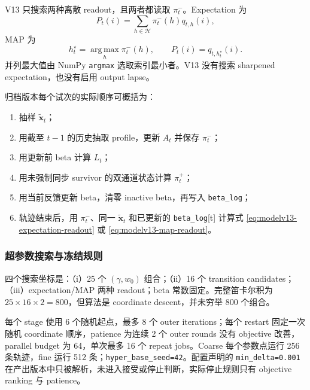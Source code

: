 V13 只搜索两种离散 readout，且两者都读取 $\pi_t^-$。Expectation 为
\begin{equation}
    P_t(i)=\sum_{h\in\mathcal H}\pi_t^-(h)q_{t,h}(i),
    \label{eq:modelv13-expectation-readout}
\end{equation}
MAP 为
\begin{equation}
    h_t^\star=\operatorname*{arg\,max}_{h}\pi_t^-(h),
    \qquad P_t(i)=q_{t,h_t^\star}(i).
    \label{eq:modelv13-map-readout}
\end{equation}
并列最大值由 NumPy \texttt{argmax} 选取索引最小者。V13 没有搜索 sharpened expectation，也没有启用 output lapse。

归档版本每个试次的实际顺序可概括为：
\begin{enumerate}
    \item 抽样 $\widetilde{\mathbf x}_t$；
    \item 用截至 $t-1$ 的历史抽取 profile，更新 $A_t$ 并保存 $\pi_t^-$；
    \item 用更新前 beta 计算 $L_t$；
    \item 用未强制同步 survivor 的双通道状态计算 $\pi_t^+$；
    \item 用当前反馈更新 beta，清零 inactive beta，再写入 \texttt{beta\_log}；
    \item 轨迹结束后，用 $\pi_t^-$、同一 $\widetilde{\mathbf x}_t$ 和已更新的 \texttt{beta\_log}[t] 计算式 \ref{eq:modelv13-expectation-readout} 或 \ref{eq:modelv13-map-readout}。
\end{enumerate}


\subsubsection{超参数搜索与冻结规则}

四个搜索坐标是：（i）25 个 $(\gamma,w_0)$ 组合；（ii）16 个 transition candidates；（iii）expectation/MAP 两种 readout；beta 常数固定。完整笛卡尔积为 $25\times16\times2=800$，但算法是 coordinate descent，并未穷举 800 个组合。

每个 stage 使用 6 个随机起点，最多 8 个 outer iterations；每个 restart 固定一次随机 coordinate 顺序，patience 为连续 2 个 outer rounds 没有 objective 改善，parallel budget 为 64，单次最多 16 个 repeat jobs。Coarse 每个参数点运行 256 条轨迹，fine 运行 512 条；\texttt{hyper\_base\_seed=42}。配置声明的 \texttt{min\_delta=0.001} 在产出版本中只被解析，未进入接受或停止判断，实际停止规则只有 objective ranking 与 patience。


